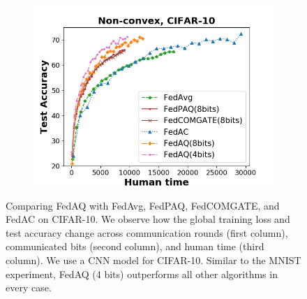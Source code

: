 \begin{figure}[hbt!]
\begin{subfigure}[b]{0.31\textwidth}
    \includegraphics[width=\textwidth]{figure/accuracy_iid_time_cnn_step100.png}
    \end{subfigure}
    \caption{Comparing FedAQ with FedAvg, FedPAQ, FedCOMGATE, and FedAC on CIFAR-10. We observe how the global training loss and test accuracy change across communication rounds (first column), communicated bits (second column), and human time (third column). We use a CNN model for CIFAR-10. Similar to the MNIST experiment, FedAQ (4 bits) outperforms all other algorithms in every case.}
    \label{cifar10_graph}
\end{figure}

